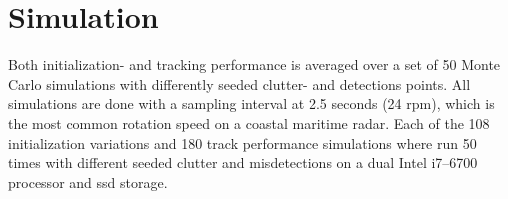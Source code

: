 \section{Simulation}
Both initialization- and tracking performance is averaged over a set of 50 Monte Carlo simulations with differently seeded clutter- and detections points. All simulations are done with a sampling interval at 2.5 seconds (24 \gls{rpm}), which is the most common rotation speed on a coastal maritime radar. Each of the 108 initialization variations and 180 track performance simulations where run 50 times with different seeded clutter and misdetections on a dual Intel i7--6700 processor and \gls{ssd} storage. 
